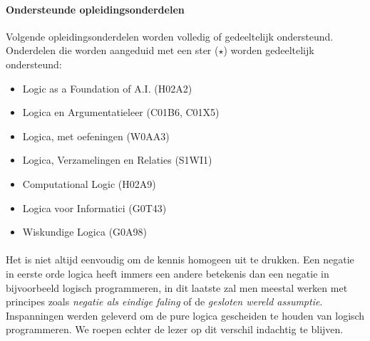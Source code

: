 \documentclass[titlepage,a4paper]{book}
\theoremstyle{definition}
\theoremstyle{remark}
\begin{document}
\paragraph{Ondersteunde opleidingsonderdelen} Volgende opleidingsonderdelen worden volledig of gedeeltelijk ondersteund. Onderdelen die worden aangeduid met een ster ($\star$) worden gedeeltelijk ondersteund:
\begin{multicols}{2}
\begin{itemize}
 \item Logic as a Foundation of A.I. (H02A2)
 \item Logica en Argumentatieleer (C01B6, C01X5)
 \item Logica, met oefeningen (W0AA3)
 \item Logica, Verzamelingen en Relaties (S1WI1)
 \item Computational Logic (H02A9)
 \item Logica voor Informatici (G0T43)
 \item Wiskundige Logica (G0A98)
\end{itemize}
\end{multicols}
\paragraph{}
Het is niet altijd eenvoudig om de kennis homogeen uit te drukken. Een negatie in eerste orde logica heeft immers een andere betekenis dan een negatie in bijvoorbeeld logisch programmeren, in dit laatste zal men meestal werken met principes zoals \emph{negatie als eindige faling} of de \emph{gesloten wereld assumptie}. Inspanningen werden geleverd om de pure logica gescheiden te houden van logisch programmeren. We roepen echter de lezer op dit verschil indachtig te blijven.
\mainmatter



\backmatter

\nocite{*}

\printindex
\end{document}
